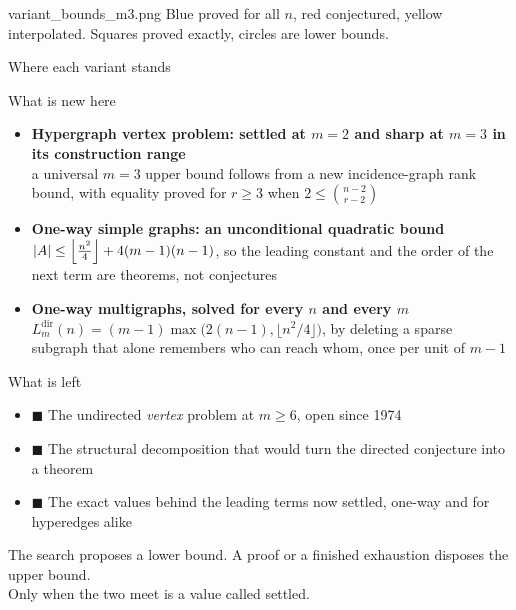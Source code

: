 \documentclass[aspectratio=1610,11pt]{beamer}
\begin{document}
  {variant_bounds_m3.png}
  {Blue proved for all $n$, red conjectured, yellow interpolated. Squares proved exactly, circles are lower bounds.}

\begin{frame}{Where each variant stands}
\vfill
\centering
\twelvetable
\vfill
\end{frame}

\begin{frame}{What is new here}
\vfill
\begin{itemize}\setlength{\itemsep}{14pt}
  \item[\color{KULblauw1}\textbf{1}] \textbf{Hypergraph vertex problem: settled at $m=2$ and sharp at $m=3$ in its construction range}\\
        {\small\color{black!60} a universal $m=3$ upper bound follows from a new incidence-graph rank bound, with equality proved for $r\ge3$ when $2\le\binom{n-2}{r-2}$}
  \item[\color{KULblauw1}\textbf{2}] \textbf{One-way simple graphs: an unconditional quadratic bound}\\
        {\small\color{black!60} $|A| \le \left\lfloor \frac{n^2}{4}\right\rfloor + 4(m-1)(n-1)$, so the leading constant and the order of the next term are theorems, not conjectures}
  \item[\color{KULblauw1}\textbf{3}] \textbf{One-way multigraphs, solved for every $n$ and every $m$}\\
        {\small\color{black!60} $L_m^{\mathrm{dir}}(n)=(m-1)\max\bigl(2(n-1),\lfloor n^2/4\rfloor\bigr)$, by deleting a sparse subgraph that alone remembers who can reach whom, once per unit of $m-1$}
\end{itemize}
\vfill
\end{frame}

\begin{frame}{What is left}
\vfill
\begin{itemize}\setlength{\itemsep}{12pt}
  \item {\color{stOpen}$\blacksquare$} The undirected \emph{vertex} problem at $m\ge6$, open since 1974
  \item {\color{stConj}$\blacksquare$} The structural decomposition that would turn the directed conjecture into a theorem
  \item {\color{stConj}$\blacksquare$} The exact values behind the leading terms now settled, one-way and for hyperedges alike
\end{itemize}

\vspace{22pt}
\centering
{\color{black!55}\small The search proposes a lower bound. A proof or a finished exhaustion disposes the upper bound.}\\[3pt]
{\color{black!55}\small Only when the two meet is a value called settled.}
\vfill
\end{frame}
\end{document}
